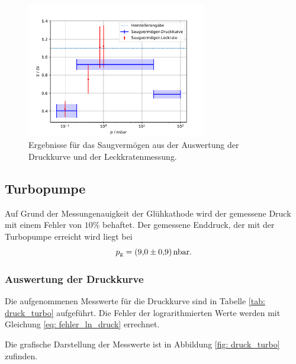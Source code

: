 \begin{figure}[h]
  \centering
  \includegraphics[width=0.7\textwidth]{../Messdaten/plots/dreh/dreh_leck_und_druck.pdf}
  \caption{Ergebnisse für das Saugvermögen aus der Auswertung der Druckkurve und der Leckkratenmessung.}
  \label{fig: dreh_druck_leck}
\end{figure}

\subsection{Turbopumpe}
Auf Grund der Messungenauigkeit der Glühkathode wird der gemessene
Druck mit einem Fehler von $10\%$ behaftet.
Der gemessene Enddruck, der mit der Turbopumpe erreicht wird liegt bei
\begin{equation}
  \label{eq:enddruck_drehschieber}
  p_{\mathrm{g}}=\SI{9.0 \pm 0.9}{\nano\bar}.
\end{equation}

\subsubsection{Auswertung der Druckkurve}
Die aufgenommenen Messwerte für die Druckkurve sind in Tabelle \ref{tab: druck_turbo}
aufgeführt. Die Fehler der lograrithmierten Werte werden mit Gleichung \eqref{eq: fehler_ln_druck} errechnet.


Die grafische Darstellung der Messwerte ist in Abbildung \ref{fig: druck_turbo} zufinden.

